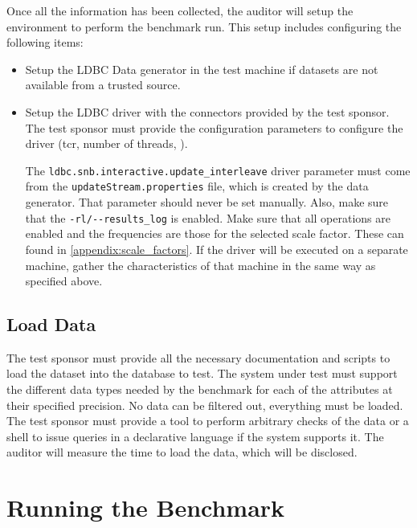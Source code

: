 Once all the information has been collected, the auditor will setup the
environment to perform the benchmark run. This setup includes configuring the
following items:


\begin{itemize}
\item Setup the LDBC Data generator in the test machine if datasets are not
available from a trusted source.
\item Setup the LDBC driver with the connectors provided by the test sponsor.
The test sponsor must provide the configuration parameters to configure the
driver (tcr, number of threads, \etc).

The \verb|ldbc.snb.interactive.update_interleave|
driver parameter must come from the \verb|updateStream.properties|
file, which is created by the data generator. That parameter should never be set manually.
Also, make sure that the \verb|-rl/--results_log| is enabled.  Make sure that
all operations are enabled and the frequencies are those for the selected scale
factor. These can found in \autoref{appendix:scale_factors}.  If the driver
will be executed on a separate machine, gather the characteristics of that
machine in the same way as specified above.
\end{itemize}


\subsection{Load Data}

The test sponsor must provide all the necessary documentation and scripts
to load the dataset into the database to test. The system under test must
support the different data types needed by the benchmark for each of the
attributes at their specified precision. No data can be filtered out, everything
must be loaded.  The test sponsor must provide a tool to perform arbitrary
checks of the data or a shell to issue queries in a declarative language if the
system supports it. The auditor will measure the time to load the data, which
will be disclosed.


\section{Running the Benchmark}

